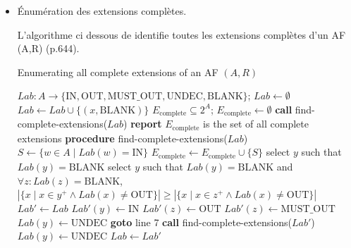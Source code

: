 \documentclass{rapportECL}
\begin{document}
\begin{itemize}
\newpage

\item Énumération des extensions complètes.


L'algorithme ci dessous de identifie toutes les extensions complètes d’un AF (A,R) \cite{c} (p.644).

\begin{algorithm}
    \caption{Enumerating all complete extensions of an AF $(A, R)$}
    \begin{algorithmic}[1]
        \STATE $Lab : A \to \{\text{IN}, \text{OUT}, \text{MUST\_OUT}, \text{UNDEC}, \text{BLANK}\}$; $Lab \gets \emptyset$
            \STATE $Lab \gets Lab \cup \{(x, \text{BLANK})\}$
        \ENDFOR
        \STATE $E_{\text{complete}} \subseteq 2^A$; $E_{\text{complete}} \gets \emptyset$
        \STATE \textbf{call} find-complete-extensions($Lab$)
        \STATE \textbf{report} $E_{\text{complete}}$ is the set of all complete extensions
        \STATE \textbf{procedure} find-complete-extensions($Lab$)
            \RETURN
        \ENDIF
            \STATE $S \gets \{w \in A \mid Lab(w) = \text{IN}\}$
            \STATE $E_{\text{complete}} \gets E_{\text{complete}} \cup \{S\}$
        \ENDIF
                \STATE select $y$ such that $Lab(y) = \text{BLANK}$
            \ELSE
                \STATE select $y$ such that $Lab(y) = \text{BLANK}$ and $\forall z : Lab(z) = \text{BLANK}$,
                \STATE $\left| \{x \mid x \in {y}^+ \land Lab(x) \neq \text{OUT} \} \right| \geq \left| \{x \mid x \in {z}^+ \land Lab(x) \neq \text{OUT} \} \right|$
            \ENDIF
            \STATE $Lab' \gets Lab$
            \STATE $Lab'(y) \gets \text{IN}$
                \STATE $Lab'(z) \gets \text{OUT}$
            \ENDFOR
                    \STATE $Lab'(z) \gets \text{MUST\_OUT}$
                \ENDIF
                    \STATE $Lab(y) \gets \text{UNDEC}$
                \ENDIF
            \ENDFOR
            \STATE \textbf{goto} line 7
            \STATE \textbf{call} find-complete-extensions($Lab'$)
                \STATE $Lab(y) \gets \text{UNDEC}$
            \ELSE
                \STATE $Lab \gets Lab'$
            \ENDIF
        \ENDWHILE
    \end{algorithmic}
\end{algorithm}


\end{itemize}
\end{document}
